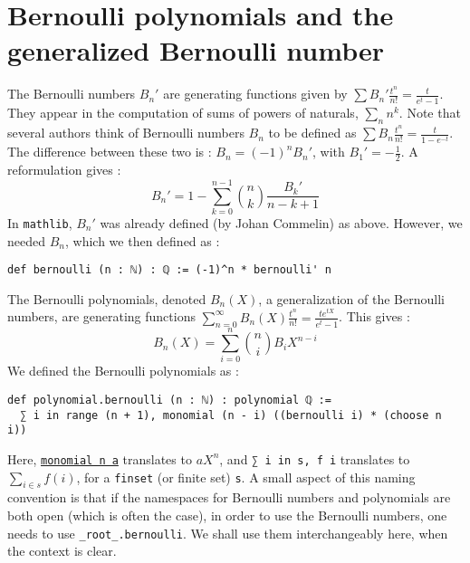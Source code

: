 \documentclass[a4paper,UKenglish,cleveref, autoref, thm-restate]{lipics-v2021}
\newcommand{\lean}[1]{\texttt{#1}\xspace} %
\begin{document}
\section{Bernoulli polynomials and the generalized Bernoulli number}
\label{ber}
The Bernoulli numbers $B_n'$ are generating functions given by $\sum B_n'\frac{t^n}{n!}=\frac{t}{e^{t} - 1}$. They appear 
in the computation of sums of powers of naturals, $\sum_n n^k$. Note that several authors think of Bernoulli numbers $B_n$ 
to be defined as $\sum B_n\frac{t^n}{n!}=\frac{t}{1-e^{-t}}$. The difference between these two is : $B_n = (-1)^n B_n'$, 
with $B_1' = - \frac{1}{2}$.
A reformulation gives :
$$ B_n' = 1 - \sum_{k = 0}^{n - 1} {n \choose k} \frac{B_k'}{n - k + 1} $$
In \lean{mathlib}, $B_n'$ was already defined (by Johan Commelin) as above. However, we needed $B_n$, which we then defined as :
\begin{lstlisting}
def bernoulli (n : ℕ) : ℚ := (-1)^n * bernoulli' n
\end{lstlisting}
The Bernoulli polynomials, denoted $B_n(X)$, a generalization of the Bernoulli numbers,
are generating functions $ \sum_{n = 0}^{\infty} B_n(X) \frac{t^n}{n!} = \frac{t e^{tX}}{e^t - 1} $. 
This gives :
$$ B_n (X) = \sum_{i = 0}^n {n \choose i} B_i X^{n - i} $$
We defined the Bernoulli polynomials as : 
\begin{lstlisting}
def polynomial.bernoulli (n : ℕ) : polynomial ℚ :=
  ∑ i in range (n + 1), monomial (n - i) ((bernoulli i) * (choose n i))
\end{lstlisting}
Here, \href{https://leanprover-community.github.io/mathlib_docs/data/polynomial/basic.html#polynomial.monomial}{\lean{monomial n a}} 
translates to $a X^n$, and \lean{∑ i in s, f i} translates to $\sum_{i \in s} f(i)$, for a \lean{finset} (or finite set) \lean{s}. A small aspect of this naming convention is that if the namespaces for Bernoulli numbers and polynomials are both open 
(which is often the case), in order to use the Bernoulli numbers, one needs to use \lean{\_root\_.bernoulli}. 
We shall use them interchangeably here, when the context is clear. 

\end{document}

